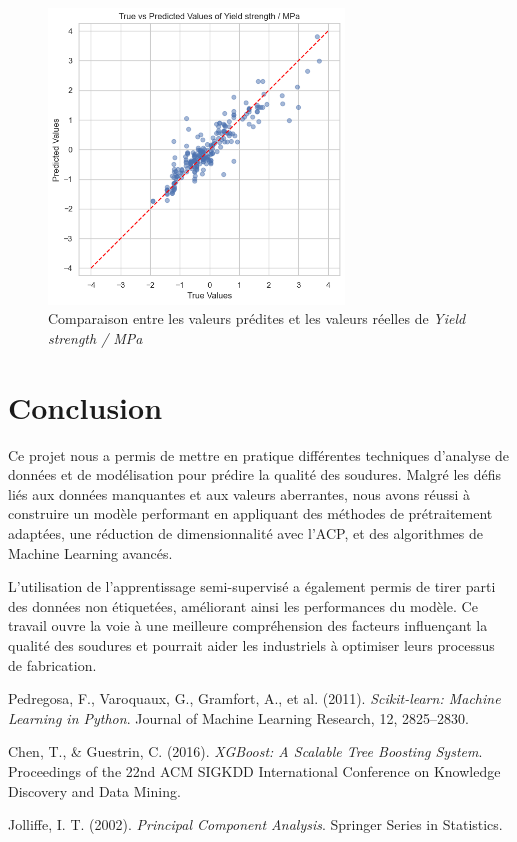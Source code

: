 \documentclass{article}
\begin{document}
\begin{figure}[H]
    \centering
    \includegraphics[width=0.7\textwidth]{images/predictions_vs_true.png}
    \caption{Comparaison entre les valeurs prédites et les valeurs réelles de \textit{Yield strength / MPa}}
    \label{fig:predictions_vs_true}
\end{figure}

\section{Conclusion}

Ce projet nous a permis de mettre en pratique différentes techniques d'analyse de données et de modélisation pour prédire la qualité des soudures. Malgré les défis liés aux données manquantes et aux valeurs aberrantes, nous avons réussi à construire un modèle performant en appliquant des méthodes de prétraitement adaptées, une réduction de dimensionnalité avec l'ACP, et des algorithmes de Machine Learning avancés.

L'utilisation de l'apprentissage semi-supervisé a également permis de tirer parti des données non étiquetées, améliorant ainsi les performances du modèle. Ce travail ouvre la voie à une meilleure compréhension des facteurs influençant la qualité des soudures et pourrait aider les industriels à optimiser leurs processus de fabrication.

\begin{thebibliography}{9}

Pedregosa, F., Varoquaux, G., Gramfort, A., et al. (2011). \textit{Scikit-learn: Machine Learning in Python}. Journal of Machine Learning Research, 12, 2825–2830.

Chen, T., \& Guestrin, C. (2016). \textit{XGBoost: A Scalable Tree Boosting System}. Proceedings of the 22nd ACM SIGKDD International Conference on Knowledge Discovery and Data Mining.

Jolliffe, I. T. (2002). \textit{Principal Component Analysis}. Springer Series in Statistics.

\end{thebibliography}
\end{document}
